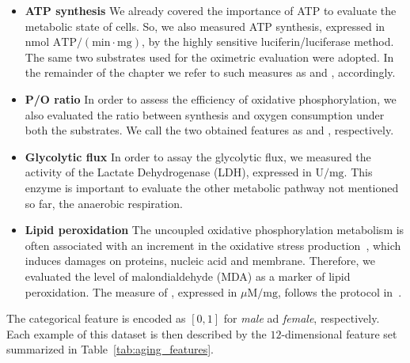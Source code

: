 \begin{itemize}
	\item[] \textbf{ATP synthesis} We already covered the importance of ATP to evaluate the metabolic state of cells. So, we also measured ATP synthesis, expressed in $\text{nmol~ATP}/(\text{min}\cdot\text{mg})$,  by the highly sensitive luciferin/luciferase method. The same two substrates used for the oximetric evaluation were adopted. In the remainder of the chapter we refer to such measures as \atppyrmal and \atpsucc, accordingly.
	
	\item[] \textbf{P/O ratio} In order to assess the efficiency of oxidative phosphorylation, we also evaluated the ratio between \ATP synthesis and oxygen consumption under both the substrates. We call the two obtained features as \popyrmal and \posucc, respectively.
	
	\item[] \textbf{Glycolytic flux} In order to assay the glycolytic flux, we measured the activity of the Lactate Dehydrogenase (\ac{LDH}), expressed in $\text{U}/\text{mg}$. This enzyme is important to evaluate the other metabolic pathway not mentioned so far, \ie the anaerobic respiration.
	
	\item[] \textbf{Lipid peroxidation} The uncoupled oxidative phosphorylation metabolism is often associated with an increment in the oxidative stress production~\cite{dai2014mitochondrial}, which induces damages on proteins, nucleic acid and membrane. Therefore, we evaluated the level of malondialdehyde (\ac{MDA}) as a marker of lipid peroxidation. The measure of \mda, expressed in $\mu\text{M}/\text{mg}$, follows the protocol in~\cite{ravera2015oxidative}.
\end{itemize}

The categorical feature \gender is encoded as $[0,1]$ for \textit{male} ad \textit{female}, respectively.
Each example of this dataset is then described by the $12$-dimensional feature set summarized in Table~\ref{tab:aging_features}.

